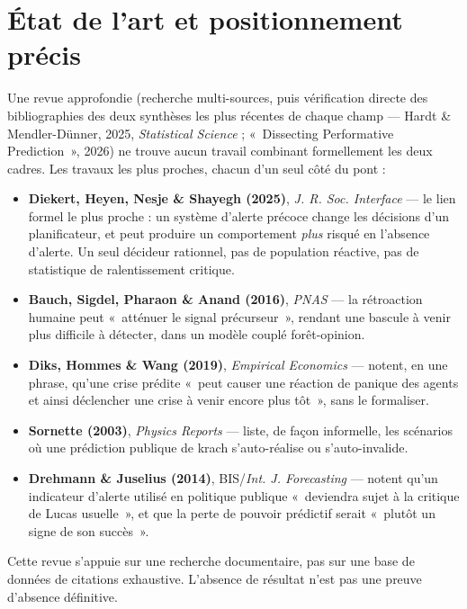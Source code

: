\documentclass[11pt,a4paper]{article}
\begin{document}
\section{État de l'art et positionnement précis}

Une revue approfondie (recherche multi-sources, puis vérification
directe des bibliographies des deux synthèses les plus récentes de
chaque champ — Hardt \& Mendler-Dünner, 2025, \emph{Statistical
Science} ; «~Dissecting Performative Prediction~», 2026) ne trouve
aucun travail combinant formellement les deux cadres. Les travaux les
plus proches, chacun d'un seul côté du pont :

\begin{itemize}[leftmargin=1.4em]
\item \textbf{Diekert, Heyen, Nesje \& Shayegh (2025)}, \emph{J. R. Soc.
  Interface} — le lien formel le plus proche : un système d'alerte
  précoce change les décisions d'un planificateur, et peut produire un
  comportement \emph{plus} risqué en l'absence d'alerte. Un seul
  décideur rationnel, pas de population réactive, pas de statistique de
  ralentissement critique.
\item \textbf{Bauch, Sigdel, Pharaon \& Anand (2016)}, \emph{PNAS} — la
  rétroaction humaine peut «~atténuer le signal précurseur~»,
  rendant une bascule à venir plus difficile à détecter, dans un modèle
  couplé forêt-opinion.
\item \textbf{Diks, Hommes \& Wang (2019)}, \emph{Empirical Economics} —
  notent, en une phrase, qu'une crise prédite «~peut causer une
  réaction de panique des agents et ainsi déclencher une crise à
  venir encore plus tôt~», sans le formaliser.
\item \textbf{Sornette (2003)}, \emph{Physics Reports} — liste, de
  façon informelle, les scénarios où une prédiction publique de krach
  s'auto-réalise ou s'auto-invalide.
\item \textbf{Drehmann \& Juselius (2014)}, BIS/\emph{Int. J.
  Forecasting} — notent qu'un indicateur d'alerte utilisé en politique
  publique «~deviendra sujet à la critique de Lucas usuelle~», et
  que la perte de pouvoir prédictif serait «~plutôt un signe de son
  succès~».
\end{itemize}

\begin{limite}
Cette revue s'appuie sur une recherche documentaire, pas sur une base de
données de citations exhaustive. L'absence de résultat n'est pas une
preuve d'absence définitive.
\end{limite}
\end{document}
